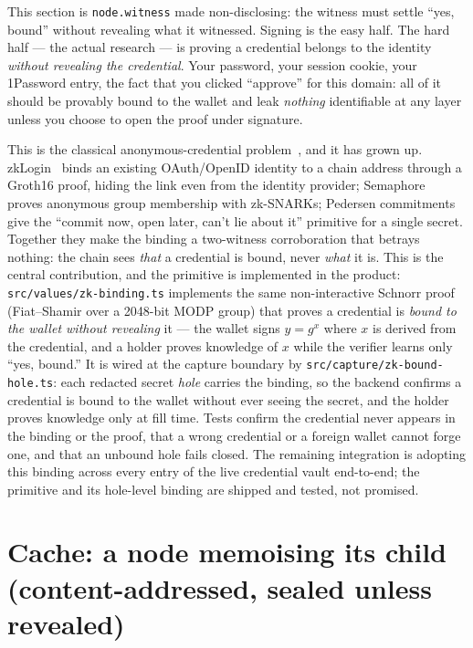 \documentclass[11pt]{article}
\begin{document}
This section is \texttt{node.witness} made non-disclosing: the witness must settle
``yes, bound'' without revealing what it witnessed. Signing is the easy half. The
hard half --- the actual research --- is proving a credential belongs to the identity
\emph{without revealing the credential}. Your
password, your session cookie, your 1Password entry, the fact that you clicked
``approve'' for this domain: all of it should be provably bound to the wallet and
leak \emph{nothing} identifiable at any layer unless you choose to open the proof
under signature.

This is the classical anonymous-credential problem~\cite{camlys}, and it has grown
up. zkLogin~\cite{zklogin} binds an existing OAuth/OpenID identity to a chain
address through a Groth16 proof, hiding the link even from the identity provider;
Semaphore~\cite{semaphore} proves anonymous group membership with zk-SNARKs;
Pedersen commitments~\cite{pedersen} give the ``commit now, open later, can't lie
about it'' primitive for a single secret. Together they make the binding a
two-witness corroboration that betrays nothing: the chain sees \emph{that} a
credential is bound, never \emph{what} it is. This is the central
contribution, and the primitive is implemented in the product: \texttt{src/values/zk-binding.ts}
implements the same non-interactive Schnorr proof (Fiat--Shamir over a 2048-bit MODP
group) that proves a credential is \emph{bound to the wallet without revealing} it ---
the wallet signs $y=g^{x}$ where $x$ is derived from the credential, and a holder
proves knowledge of $x$ while the verifier learns only ``yes, bound.'' It is wired at
the capture boundary by \texttt{src/capture/zk-bound-hole.ts}: each redacted secret
\emph{hole} carries the binding, so the backend confirms a credential is bound to the
wallet without ever seeing the secret, and the holder proves knowledge only at fill
time. Tests confirm the credential never appears in the binding or the proof, that a
wrong credential or a foreign wallet cannot forge one, and that an unbound hole fails
closed. The remaining integration is adopting this binding across every entry of the
live credential vault end-to-end; the primitive and its hole-level binding are shipped
and tested, not promised.

\section{Cache: a node memoising its child (content-addressed, sealed unless revealed)}
\end{document}
